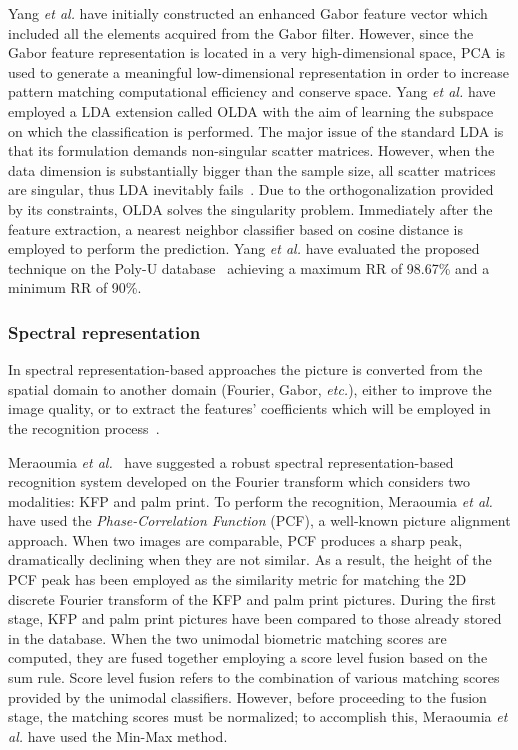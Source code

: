 \documentclass[journal]{IEEEtran}
\begin{document}
Yang \textit{et al.} have initially constructed an enhanced Gabor feature vector which included all the elements acquired from the Gabor filter. However, since the Gabor feature representation is located in a very high-dimensional space, PCA is used to generate a meaningful low-dimensional representation in order to increase pattern matching computational efficiency and conserve space.
Yang \textit{et al.} have employed a LDA extension called OLDA with the aim of learning the subspace on which the classification is performed. The major issue of the standard LDA is that its formulation demands non-singular scatter matrices. However, when the data dimension is substantially bigger than the sample size, all scatter matrices are singular, thus LDA inevitably fails~\cite{nullspace}. 
Due to the orthogonalization provided by its constraints, OLDA solves the singularity problem.
Immediately after the feature extraction, a nearest neighbor classifier based on cosine distance is employed to perform the prediction.
Yang \textit{et al.} have evaluated the proposed technique on the Poly-U database~\cite{polyu1} achieving a maximum RR of 98.67\% and a minimum RR of 90\%.

\subsubsection{Spectral representation}
In spectral representation-based approaches the picture is converted from the spatial domain to another domain (Fourier, Gabor, \textit{etc.}), either to improve the image quality, or to extract the features' coefficients which will be employed in the recognition process~\cite{biometricknuckleprint}.

Meraoumia \textit{et al.}~\cite{Meraoumia} have suggested a robust spectral representation-based recognition system developed on the Fourier transform which considers two modalities: KFP and palm print.
To perform the recognition, Meraoumia \textit{et al.} have used the \emph{Phase-Correlation Function} (PCF), a well-known picture alignment approach. When two images are comparable, PCF produces a sharp peak, dramatically declining when they are not similar.
As a result, the height of the PCF peak has been employed as the similarity metric for matching the 2D discrete Fourier transform of the KFP and palm print pictures.
During the first stage, KFP and palm print pictures have been compared to those already stored in the database.
When the two unimodal biometric matching scores are computed, they are fused together employing a score level fusion based on the sum rule. Score level fusion refers to the combination of various matching scores provided by the unimodal classifiers. However, before proceeding to the fusion stage, the matching scores must be normalized; to accomplish this, Meraoumia \textit{et al.} have used the Min-Max method.
\end{document}
